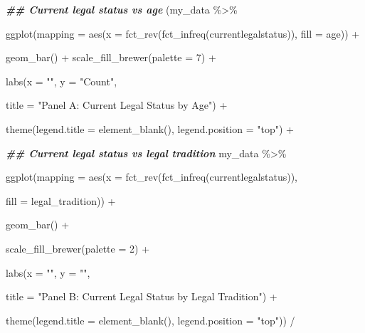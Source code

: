 \documentclass[a4paper,nobind]{templates/ociamthesis}
\newenvironment{Shaded}{\begin{snugshade}}{\end{snugshade}}
\newcommand{\AttributeTok}[1]{\textcolor[rgb]{0.77,0.63,0.00}{#1}}
\newcommand{\DecValTok}[1]{\textcolor[rgb]{0.00,0.00,0.81}{#1}}
\newcommand{\DocumentationTok}[1]{\textcolor[rgb]{0.56,0.35,0.01}{\textbf{\textit{#1}}}}
\newcommand{\FunctionTok}[1]{\textcolor[rgb]{0.00,0.00,0.00}{#1}}
\newcommand{\NormalTok}[1]{#1}
\newcommand{\SpecialCharTok}[1]{\textcolor[rgb]{0.00,0.00,0.00}{#1}}
\newcommand{\StringTok}[1]{\textcolor[rgb]{0.31,0.60,0.02}{#1}}
\renewenvironment{Shaded}
{
  \vspace{10pt}%
  \begin{snugshade}%
}{%
  \end{snugshade}%
  \vspace{8pt}%
}
\begin{document}
\begin{Shaded}
\begin{Highlighting}[]
\DocumentationTok{\#\# Current legal status vs age}
\NormalTok{(my\_data }\SpecialCharTok{\%\textgreater{}\%} 
  
  \FunctionTok{ggplot}\NormalTok{(}\AttributeTok{mapping =} \FunctionTok{aes}\NormalTok{(}\AttributeTok{x =} \FunctionTok{fct\_rev}\NormalTok{(}\FunctionTok{fct\_infreq}\NormalTok{(currentlegalstatus)), }\AttributeTok{fill =}\NormalTok{ age)) }\SpecialCharTok{+} 
  
  \FunctionTok{geom\_bar}\NormalTok{() }\SpecialCharTok{+} \FunctionTok{scale\_fill\_brewer}\NormalTok{(}\AttributeTok{palette =} \DecValTok{7}\NormalTok{) }\SpecialCharTok{+} 
  
  \FunctionTok{labs}\NormalTok{(}\AttributeTok{x =} \StringTok{""}\NormalTok{, }\AttributeTok{y =} \StringTok{"Count"}\NormalTok{, }
       
       \AttributeTok{title =} \StringTok{"Panel A: Current Legal Status by Age"}\NormalTok{) }\SpecialCharTok{+} 
   
   \FunctionTok{theme}\NormalTok{(}\AttributeTok{legend.title =} \FunctionTok{element\_blank}\NormalTok{(), }\AttributeTok{legend.position =} \StringTok{"top"}\NormalTok{) }\SpecialCharTok{+} 


\DocumentationTok{\#\# Current legal status vs legal tradition}
\NormalTok{my\_data }\SpecialCharTok{\%\textgreater{}\%} 
  
\FunctionTok{ggplot}\NormalTok{(}\AttributeTok{mapping =} \FunctionTok{aes}\NormalTok{(}\AttributeTok{x =} \FunctionTok{fct\_rev}\NormalTok{(}\FunctionTok{fct\_infreq}\NormalTok{(currentlegalstatus)), }
                     
                     \AttributeTok{fill =}\NormalTok{ legal\_tradition)) }\SpecialCharTok{+} 
  
  \FunctionTok{geom\_bar}\NormalTok{() }\SpecialCharTok{+} 
  
  \FunctionTok{scale\_fill\_brewer}\NormalTok{(}\AttributeTok{palette =} \DecValTok{2}\NormalTok{) }\SpecialCharTok{+} 
  
  \FunctionTok{labs}\NormalTok{(}\AttributeTok{x =} \StringTok{""}\NormalTok{, }\AttributeTok{y =} \StringTok{""}\NormalTok{, }
       
       \AttributeTok{title =} \StringTok{"Panel B: Current Legal Status by Legal Tradition"}\NormalTok{) }\SpecialCharTok{+} 
  
  \FunctionTok{theme}\NormalTok{(}\AttributeTok{legend.title =} \FunctionTok{element\_blank}\NormalTok{(), }\AttributeTok{legend.position =} \StringTok{"top"}\NormalTok{)) }\SpecialCharTok{/}


\end{Highlighting}
\end{Shaded}
\end{document}

